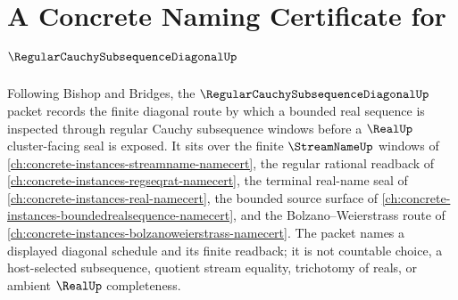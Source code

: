 \chapter{A Concrete Naming Certificate for $\RegularCauchySubsequenceDiagonalUp$}
\label{ch:concrete-instances-regular-cauchy-subsequence-diagonal-namecert}

Following Bishop and Bridges, the $\RegularCauchySubsequenceDiagonalUp$ packet records the finite diagonal route by which a bounded real sequence is inspected through regular Cauchy subsequence windows before a $\RealUp$ cluster-facing seal is exposed. It sits over the finite $\StreamNameUp$ windows of \autoref{ch:concrete-instances-streamname-namecert}, the regular rational readback of \autoref{ch:concrete-instances-regseqrat-namecert}, the terminal real-name seal of \autoref{ch:concrete-instances-real-namecert}, the bounded source surface of \autoref{ch:concrete-instances-boundedrealsequence-namecert}, and the Bolzano--Weierstrass route of \autoref{ch:concrete-instances-bolzanoweierstrass-namecert}. The packet names a displayed diagonal schedule and its finite readback; it is not countable choice, a host-selected subsequence, quotient stream equality, trichotomy of reals, or ambient $\RealUp$ completeness.

